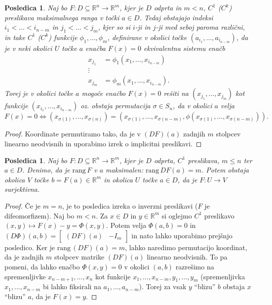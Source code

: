 \documentclass[10pt, a4paper]{article}
\newtheorem{posledica}[izr]{Posledica}
\newenvironment{noticeC}{%
  \tcolorbox[%
  notitle,
  empty,
  enhanced,  %
  breakable,
  coltext=black, 
  fontupper=\rmfamily,
  parbox=false,
  noparskip,
  sharp corners,
  boxrule=-1pt,  %
  frame hidden,
  left=7pt,  %
  right=7pt,
  top=5pt,
  bottom=5pt,
  before skip=2.5ex plus 2pt,
  after skip=2.5ex plus 2pt,
  overlay unbroken and last={%
  },
  ]}
{\endtcolorbox}
\newenvironment{dokaz}%
  {\begin{noticeC}\begin{proof}}%
  {\end{proof}\end{noticeC}}
\newcommand{\R}{\mathbb {R}}
\newcommand{\rang}{\mathrm{\text{rang}}\,}
\begin{document}
\begin{posledica}
    Naj bo $F: D \subseteq \R^n \to \R^m$, kjer je $D$ odprta in $m < n$, $C^1$ ($C^k$) preslikava maksimalnega ranga
    v točki $a \in D$. Tedaj obstajajo indeksi $i_1 < \dots < i_{n - m}$ in $j_1 < \dots < j_m$, kjer so si $i$-ji in $j$-ji med seboj paroma različni,
    in take $C^1$ ($C^k$) funkcije $\phi_1, \dots, \phi_m$, definirane v okolici točke $(a_{i_1}, \dots, a_{i_{n - m}})$, 
    da je v neki okolici $U$ točke $a$ enačba $F(x) = 0$ ekvivalentna sistemu enačb
    \begin{align*}
        x_{j_1} &= \phi_1 (x_1, \dots, x_{i_{n-m}})\\
        \vdots &\\
        x_{j_m} &= \phi_m (x_1, \dots, x_{i_{n-m}}).
    \end{align*}
    Torej je v okolici točke $a$ mogoče enačbo $F(x) = 0$ rešiti na $(x_{j_1}, \dots, x_{j_m})$
    kot funkcije $(x_{i_1}, \dots, x_{i_{n - m}})$ oz. obstaja permutacija $\sigma \in S_n$, da 
    v okolici $a$ velja 
    $$F(x) = 0 \Leftrightarrow (x_{\sigma (1)}, \dots, x_{\sigma (n)}) = (x_{\sigma (1)}, \dots, x_{\sigma (n - m)}, \phi(x_{\sigma (1)}, \dots, x_{\sigma (n - m)})).$$
\end{posledica}

\begin{dokaz}
    Koordinate permutiramo tako, da je v $(DF)(a)$ zadnjih $m$ stolpcev linearno neodvisnih
    in uporabimo izrek o implicitni preslikavi.
\end{dokaz}

\begin{posledica}
    Naj bo $F: D \subseteq \R^n \to \R^m$, kjer je $D$ odprta, $C^1$ preslikava, $m \leq n$ 
    ter $a \in D$.
    Denimo, da je $\rang F$ v $a$ maksimalen: $\rang DF (a) = m$.
    Potem obstaja okolica $V$ točke $b = F(a) \in \R^m$ in okolica $U$ točke $a \in D$, 
    da je $F: U \to V$ surjektivna. 
\end{posledica}

\begin{dokaz}
    Če je $m = n$, je to posledica izreka o inverzni preslikavi ($F$ je difeomorfizem).
    Naj bo $m < n$. Za $x \in D$ in $y \in \R^m$ si oglejmo $C^1$ preslikavo 
    $(x, y) \mapsto F(x) - y = \Phi(x, y)$.
    Potem velja $\Phi (a, b) = 0$ in $(D \Phi) (a, b) = \begin{bmatrix}
        (DF)(a) & - I_m
    \end{bmatrix}$
    in nato lahko uporabimo prejšnjo posledico.
    Ker je $\rang (DF)(a) = m$, lahko naredimo permutacijo koordinat,
    da je zadnjih $m$ stolpcev matrike $(DF)(a)$ linearno neodvisnih.
    To pa pomeni, da lahko enačbo $\Phi (x, y) = 0$ v okolici $(a, b)$
    razrešimo na spremenljivke $x_{n - m + 1}, \dots, x_n$ kot funkcije 
    $x_1, \dots, x_{n - m}, y_1, \dots, y_m$ (spremenljivka $x_1, \dots, x_{n - m}$ bi lahko fiksirali
    na $a_1, \dots, a_{n - m}$). Torej za vsak
    $y$ "`blizu"' $b$ obstaja $x$ "`blizu"' $a$, da je $F(x) = y$.
\end{dokaz}
\end{document}

